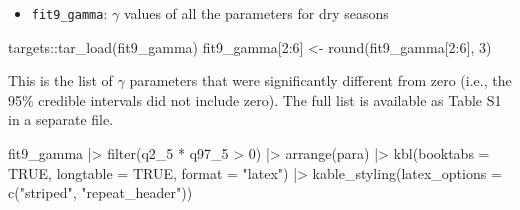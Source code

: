 \documentclass[
  11pt,
  letterpaper,
  DIV=11,
  numbers=noendperiod]{scrartcl}
\newenvironment{Shaded}{}{}
\newcommand{\AttributeTok}[1]{\textcolor[rgb]{0.84,0.23,0.29}{#1}}
\newcommand{\ConstantTok}[1]{\textcolor[rgb]{0.00,0.36,0.77}{#1}}
\newcommand{\DecValTok}[1]{\textcolor[rgb]{0.00,0.36,0.77}{#1}}
\newcommand{\FunctionTok}[1]{\textcolor[rgb]{0.44,0.26,0.76}{#1}}
\newcommand{\NormalTok}[1]{\textcolor[rgb]{0.14,0.16,0.18}{#1}}
\newcommand{\OtherTok}[1]{\textcolor[rgb]{0.44,0.26,0.76}{#1}}
\newcommand{\SpecialCharTok}[1]{\textcolor[rgb]{0.00,0.36,0.77}{#1}}
\newcommand{\StringTok}[1]{\textcolor[rgb]{0.01,0.18,0.38}{#1}}
\providecommand{\tightlist}{%
  \setlength{\itemsep}{0pt}\setlength{\parskip}{0pt}}\usepackage{longtable,booktabs,array}
\begin{document}
\begin{itemize}
\tightlist
\item
  \texttt{fit9\_gamma}: \(\gamma\) values of all the parameters for dry
  seasons
\end{itemize}

\begin{Shaded}
\begin{Highlighting}[]
\NormalTok{targets}\SpecialCharTok{::}\FunctionTok{tar\_load}\NormalTok{(fit9\_gamma)}
\NormalTok{fit9\_gamma[}\DecValTok{2}\SpecialCharTok{:}\DecValTok{6}\NormalTok{] }\OtherTok{\textless{}{-}} \FunctionTok{round}\NormalTok{(fit9\_gamma[}\DecValTok{2}\SpecialCharTok{:}\DecValTok{6}\NormalTok{], }\DecValTok{3}\NormalTok{)}
\end{Highlighting}
\end{Shaded}

This is the list of \(\gamma\) parameters that were significantly
different from zero (i.e., the 95\% credible intervals did not include
zero). The full list is available as Table S1 in a separate file.

\begin{Shaded}
\begin{Highlighting}[]
\NormalTok{fit9\_gamma }\SpecialCharTok{|\textgreater{}}
  \FunctionTok{filter}\NormalTok{(q2\_5 }\SpecialCharTok{*}\NormalTok{ q97\_5 }\SpecialCharTok{\textgreater{}} \DecValTok{0}\NormalTok{) }\SpecialCharTok{|\textgreater{}}
  \FunctionTok{arrange}\NormalTok{(para) }\SpecialCharTok{|\textgreater{}}
  \FunctionTok{kbl}\NormalTok{(}\AttributeTok{booktabs =} \ConstantTok{TRUE}\NormalTok{, }\AttributeTok{longtable =} \ConstantTok{TRUE}\NormalTok{, }\AttributeTok{format =} \StringTok{"latex"}\NormalTok{) }\SpecialCharTok{|\textgreater{}}
  \FunctionTok{kable\_styling}\NormalTok{(}\AttributeTok{latex\_options =} \FunctionTok{c}\NormalTok{(}\StringTok{"striped"}\NormalTok{, }\StringTok{"repeat\_header"}\NormalTok{))}
\end{Highlighting}
\end{Shaded}
\end{document}
